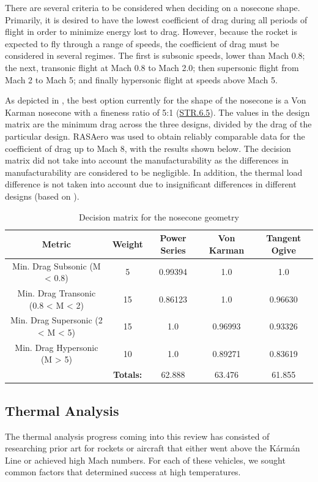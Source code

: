 There are several criteria to be considered when deciding on a nosecone shape. Primarily, it is desired to have the lowest coefficient of drag during all periods of flight in order to minimize energy lost to drag. However, because the rocket is expected to fly through a range of speeds, the coefficient of drag must be considered in several regimes. The first is subsonic speeds, lower than Mach 0.8; the next, transonic flight at Mach 0.8 to Mach 2.0; then supersonic flight from Mach 2 to Mach 5; and finally hypersonic flight at speeds above Mach 5.

As depicted in , the best option currently for the shape of the nosecone is a Von Karman nosecone with a fineness ratio of 5:1 (\hyperlink{STR.6.5}{STR.6.5}). The values in the design matrix are the minimum drag across the three designs, divided by the drag of the particular design. RASAero was used to obtain reliably comparable data for the coefficient of drag up to Mach 8, with the results shown below. The decision matrix did not take into account the manufacturability as the differences in manufacturability are considered to be negligible. In addition, the thermal load difference is not taken into account due to insignificant differences in different designs (based on \cite{mcgill}).

\begin{table}
    \centering
    \begin{tabular}{cc||ccc}
        \textbf{Metric} & \textbf{Weight} & Power Series & Von Karman & Tangent Ogive \\ \hline
        Min. Drag Subsonic (M < 0.8) & 5 & 0.99394 & 1.0 & 1.0 \\ 
        Min. Drag Transonic (0.8 < M < 2) & 15 & 0.86123 & 1.0 & 0.96630 \\ 
        Min. Drag Supersonic (2 < M < 5) & 15 & 1.0 & 0.96993 & 0.93326 \\ 
        Min. Drag Hypersonic (M > 5) & 10 & 1.0 & 0.89271 & 0.83619 \\ \hline 
         & \textbf{Totals:} & 62.888 & 63.476 & 61.855
    \end{tabular}
    \caption{Decision matrix for the nosecone geometry}
    \label{table:nosecone-design-matrix}
\end{table}



\subsection{Thermal Analysis}
The thermal analysis progress coming into this review has consisted of researching prior art for rockets or aircraft that either went above the K\'{a}rm\'{a}n Line or achieved high Mach numbers. For each of these vehicles, we sought common factors that determined success at high temperatures.

